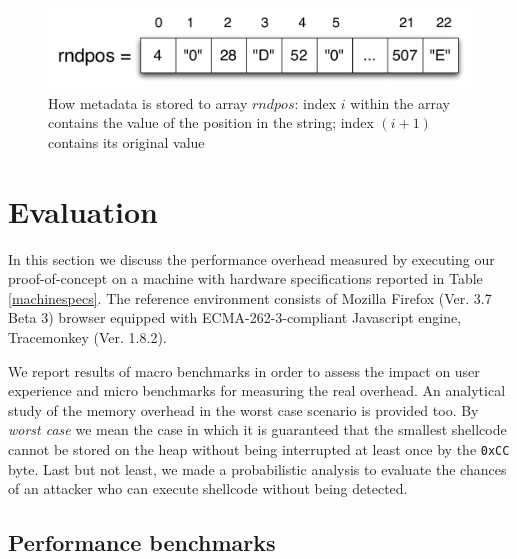 \begin{figure}[t]
\begin{center}
\includegraphics[scale=0.4]{images/rndpos}
\caption{{How metadata is stored to array $rndpos$: index $i$ within the array contains the value of the position in the string; index $(i+1)$ contains its original value}}
\label{rndposarray}
\end{center}
\end{figure}



\section{Evaluation} \label{bub:eval}
In this section we discuss the performance overhead measured by executing our proof-of-concept on a machine with  hardware specifications reported in Table \ref{machinespecs}. The reference environment consists of Mozilla Firefox (Ver. 3.7 Beta 3) browser \cite{mozilla} equipped with ECMA-262-3-compliant Javascript engine, Tracemonkey (Ver. 1.8.2)\cite{ECMA-262}.

We report results of macro benchmarks in order to assess the impact on user experience and micro benchmarks for  measuring the real overhead. An analytical study of the memory overhead in the worst case scenario is provided too. By \textit{worst case} we mean the case in which it is guaranteed that the smallest shellcode cannot be stored on the heap without being interrupted at least once by the \texttt{0xCC} byte.
Last but not least, we made a probabilistic analysis to evaluate the chances of an attacker who can execute shellcode without being detected.

\subsection{Performance benchmarks} \label{perfover}
